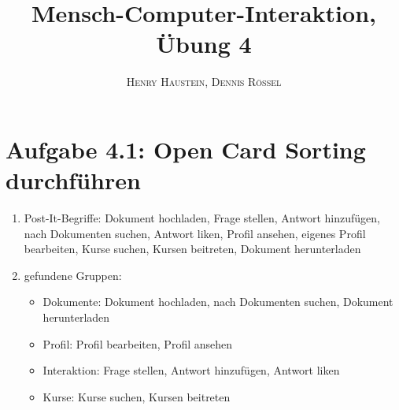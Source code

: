 \documentclass{article}
\title{\textbf{Mensch-Computer-Interaktion, Übung 4}}
\author{\textsc{Henry Haustein}, \textsc{Dennis Rössel}}
\date{}
\begin{document}
	\maketitle
	
	\section*{Aufgabe 4.1: Open Card Sorting durchführen}
	\begin{enumerate}[label=(\alph*)]
		\item Post-It-Begriffe: Dokument hochladen, Frage stellen, Antwort hinzufügen, nach Dokumenten suchen, Antwort liken, Profil ansehen, eigenes Profil bearbeiten, Kurse suchen, Kursen beitreten, Dokument herunterladen
		\item gefundene Gruppen:
		\begin{itemize}
			\item Dokumente: Dokument hochladen, nach Dokumenten suchen, Dokument herunterladen
			\item Profil: Profil bearbeiten, Profil ansehen
			\item Interaktion: Frage stellen, Antwort hinzufügen, Antwort liken
			\item Kurse: Kurse suchen, Kursen beitreten
		\end{itemize}
	\end{enumerate}
\end{document}
